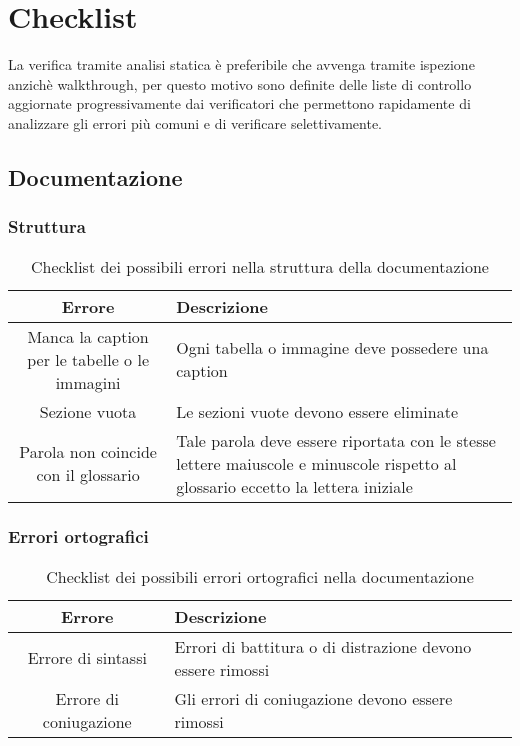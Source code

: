 \section{Checklist}
La verifica tramite analisi statica è preferibile che avvenga tramite ispezione anzichè walkthrough, per questo motivo sono definite delle liste di controllo aggiornate progressivamente dai verificatori che permettono rapidamente di analizzare gli errori più comuni e di verificare selettivamente.

\subsection{Documentazione}
\subsubsection{Struttura}
\begin{table}[h]
\centering
\begin{tabular}{|c|p{8cm}|}
\hline
\textbf{Errore} & \textbf{Descrizione} \\
\hline
Manca la caption per le tabelle o le immagini &  Ogni tabella o immagine deve possedere una caption\\
\hline
Sezione vuota & Le sezioni vuote devono essere eliminate\\
\hline
Parola non coincide con il glossario & Tale parola deve essere riportata con le stesse lettere maiuscole e minuscole rispetto al glossario eccetto la lettera iniziale\\
\hline
\end{tabular}
\caption{Checklist dei possibili errori nella struttura della documentazione}
\end{table}

\subsubsection{Errori ortografici}
\begin{table}[h]
\centering
\begin{tabular}{|c|p{8cm}|}
\hline
\textbf{Errore} & \textbf{Descrizione} \\
\hline
Errore di sintassi &  Errori di battitura o di distrazione devono essere rimossi\\
\hline
Errore di coniugazione & Gli errori di coniugazione devono essere rimossi\\
\hline
\end{tabular}
\caption{Checklist dei possibili errori ortografici nella documentazione}
\end{table}

